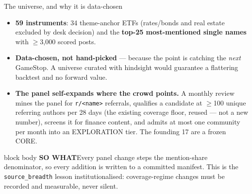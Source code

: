 \documentclass[aspectratio=169,11pt]{beamer}
\newcommand{\sowhatfont}{\footnotesize}
\newcommand{\sowhat}[1]{%
  \vspace{0.3em}
  \begin{beamercolorbox}[wd=\linewidth,sep=0.55em]{block body}
    {\sowhatfont\textbf{\color{gicnavy}SO WHAT}\quad #1}
  \end{beamercolorbox}}
\begin{document}
\begin{frame}{The universe, and why it is data-chosen}
  \begin{itemize}\small
    \item \textbf{59 instruments}: 34 theme-anchor ETFs (rates/bonds and real
      estate excluded by desk decision) and the \textbf{top-25 most-mentioned
      single names} with $\geq$3{,}000 scored posts.
    \item \textbf{Data-chosen, not hand-picked} --- because the point is
      catching the \emph{next} GameStop. A universe curated with hindsight
      would guarantee a flattering backtest and no forward value.
    \item \textbf{The panel self-expands where the crowd points.} A monthly
      review mines the panel for \texttt{r/<name>} referrals, qualifies a
      candidate at $\geq$100 unique referring authors per 28 days (the
      existing coverage floor, reused --- not a new number), screens it for
      finance content, and admits at most one community per month into an
      EXPLORATION tier. The founding 17 are a frozen CORE.
  \end{itemize}
  \sowhat{Every panel change steps the mention-share denominator, so every
    addition is written to a committed manifest. This is the
    \texttt{source\_breadth} lesson institutionalised: coverage-regime changes
    must be recorded and measurable, never silent.}
\end{frame}

\end{document}
